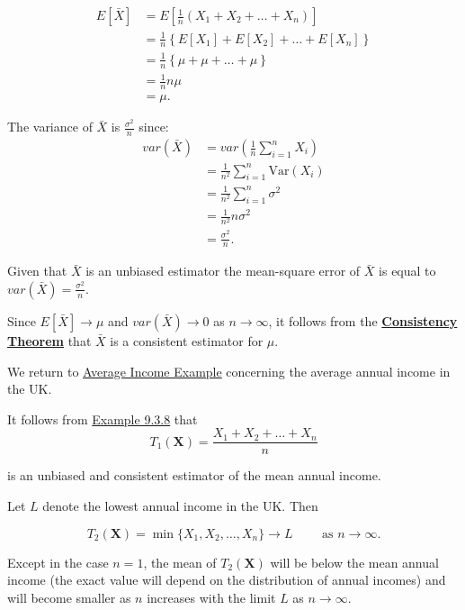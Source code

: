 \documentclass[
]{book}
\begin{document}
\begin{align*}
E[\bar{X}] &= E \left[ \frac{1}{n} \left( X_1 + X_2 + \ldots + X_n \right) \right] \\
&= \frac{1}{n} \left\{ E [X_1] + E[X_2] + \ldots + E[X_n] \right\} \\
&= \frac{1}{n} \left\{ \mu + \mu + \ldots + \mu \right\} \\
&= \frac{1}{n} n \mu \\
&= \mu.
\end{align*}

The variance of \(\bar{X}\) is \(\frac{\sigma^2}{n}\) since:\\

\begin{align*}
var(\bar{X}) &= var \left( \frac{1}{n} \sum_{i=1}^n X_i \right) \\ 
&= \frac{1}{n^2} \sum_{i=1}^n \text{Var}(X_i) \\
&= \frac{1}{n^2} \sum_{i=1}^n \sigma^2 \\
&= \frac{1}{n^2} n\sigma^2 \\
&= \frac{\sigma^2}{n}.
\end{align*}

Given that \(\bar{X}\) is an unbiased estimator the mean-square error of \(\bar{X}\) is equal to \(var(\bar{X})=\frac{\sigma^2}{n}\).

Since \(E[\bar{X}] \rightarrow \mu\) and \(var(\bar{X}) \rightarrow 0\) as \(n \rightarrow \infty\), it follows from the \protect\hyperlink{paraestimate:thm:consistent_estimator_thm}{\textbf{Consistency Theorem}} that \(\bar{X}\) is a consistent estimator for \(\mu\).

\hfill\break

We return to \protect\hyperlink{paraestimate:ex:income_ex}{Average Income Example} concerning the average annual income in the UK.

It follows from \protect\hyperlink{paraestimate:exer:xbar}{Example 9.3.8} that\\

\[T_1 (\mathbf{X}) = \frac{X_1 + X_2 +\ldots + X_n}{n}\]

is an unbiased and consistent estimator of the mean annual income.

Let \(L\) denote the lowest annual income in the UK. Then

\[ T_2 (\mathbf{X}) = \min \{ X_1, X_2, \ldots, X_n \} \rightarrow L \qquad \mbox{ as } n \rightarrow \infty. \]

Except in the case \(n=1\), the mean of \(T_2 (\mathbf{X})\) will be below the mean annual income (the exact value will depend on the distribution of annual incomes) and will become smaller as \(n\) increases with the limit \(L\) as \(n \rightarrow \infty\).
\end{document}
